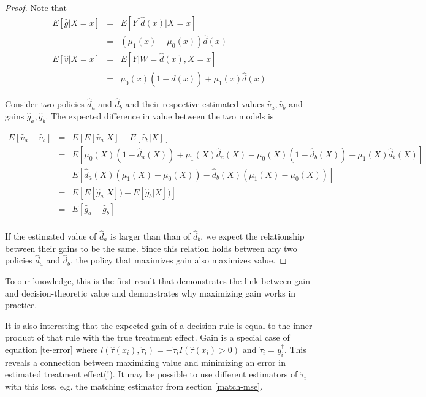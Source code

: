 \begin{proof}
Note that
\[
\begin{array}{rcl}	
	E[\hat g | X=x] & = & E[Y^{\dagger} \hat d(x) | X=x]  \\
	& =  & (\mu_1(x)-\mu_0(x))  \hat d(x)  \\
	E[\hat v | X=x] & = & E[Y | W=\hat d(x), X=x]  \\
	& = & \mu_0(x)(1-\hat d(x)) + \mu_1(x)\hat d(x)
\end{array}
\]

Consider two policies $\hat d_a$ and $\hat d_b$ and their respective estimated values $\hat v_a, \hat v_b$  and gains $\hat g_a, \hat g_b$. The expected difference in value between the two models is 

\[
\begin{array}{rcl}
E[\hat v_a - \hat v_b] 

& = & E[E[\hat v_a | X] - E[\hat v_b|X]] \\

&=& E \left[
	\mu_0(X)(1-\hat d_a(X)) + \mu_1(X)\hat d_a(X) 
      - \mu_0(X)(1-\hat d_b(X)) -  \mu_1(X)\hat d_b(X)
\right] \\

&=& E \left[
	  \hat d_a(X) (\mu_1(X)  - \mu_0(X) ) 
	- \hat d_b(X) (\mu_1(X)  - \mu_0(X) )
\right] \\

&=& E \left[
	  E[\hat g_a | X] ) 
	- E[\hat g_b | X] )
\right] \\

&=& E \left[ \hat g_a - \hat g_b \right] \\

\end{array}
\]

If the estimated value of $\hat d_a$ is larger than than of $\hat d_b$, we expect the relationship between their gains to be the same. Since this relation holds between any two policies $\hat d_a$ and $\hat d_b$, the policy that maximizes gain also maximizes value.

\end{proof}

To our knowledge, this is the first result that demonstrates the link between gain and decision-theoretic value and demonstrates why maximizing gain works in practice. 

It is also interesting that the expected gain of a decision rule is equal to the inner product of that rule with the true treatment effect. Gain is a special case of equation \ref{te-error} where $l(\hat \tau (x_i), \check \tau_i) = -\check \tau_i  I(\hat \tau (x_i) > 0)$ and $\check\tau_i = y_i^{\dagger}$. This reveals a connection between maximizing value and minimizing an error in estimated treatment effect(!). It may be possible to use different estimators of $\check\tau_i$ with this loss, e.g. the matching estimator from section \ref{match-mse}.


